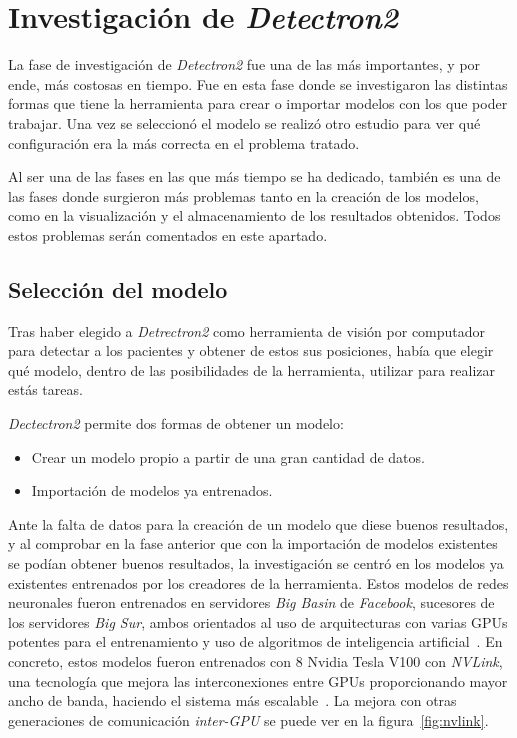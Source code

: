 {\section{Investigación de \textit{Detectron2}}
La fase de investigación de \textit{Detectron2} fue una de las más importantes, y por ende, más costosas en tiempo. Fue en esta fase donde se investigaron las distintas formas que tiene la herramienta para crear o importar modelos con los que poder trabajar. Una vez se seleccionó el modelo se realizó otro estudio para ver qué configuración era la más correcta en el problema tratado.

Al ser una de las fases en las que más tiempo se ha dedicado, también es una de las fases donde surgieron más problemas tanto en la creación de los modelos, como en la visualización y el almacenamiento de los resultados obtenidos. Todos estos problemas serán comentados en este apartado.  
\subsection{Selección del modelo}
Tras haber elegido a \textit{Detrectron2} como herramienta de visión por computador para detectar a los pacientes y obtener de estos sus posiciones, había que elegir qué modelo, dentro de las posibilidades de la herramienta, utilizar para realizar estás tareas.

\textit{Dectectron2} permite dos formas de obtener un modelo:
\begin{itemize}
	\item Crear un modelo propio a partir de una gran cantidad de datos.
	\item Importación de modelos ya entrenados.
\end{itemize}

Ante la falta de datos para la creación de un modelo que diese buenos resultados, y al comprobar en la fase anterior que con la importación de modelos existentes se podían obtener buenos resultados, la investigación se centró en los modelos ya existentes entrenados por los creadores de la herramienta. Estos modelos de redes neuronales fueron entrenados en servidores \textit{Big Basin} de \textit{Facebook}, sucesores de los servidores \textit{Big Sur}, ambos orientados al uso de arquitecturas con varias GPUs potentes para el entrenamiento y uso de algoritmos de inteligencia artificial~\cite{bigbasin}. En concreto, estos modelos fueron entrenados con 8 Nvidia Tesla V100 con \textit{NVLink}, una tecnología que mejora las interconexiones entre GPUs proporcionando mayor ancho de banda, haciendo el sistema más escalable~\cite{nvlink}. La mejora con otras generaciones de comunicación \textit{inter-GPU} se puede ver en la figura~\ref{fig:nvlink}.

}

